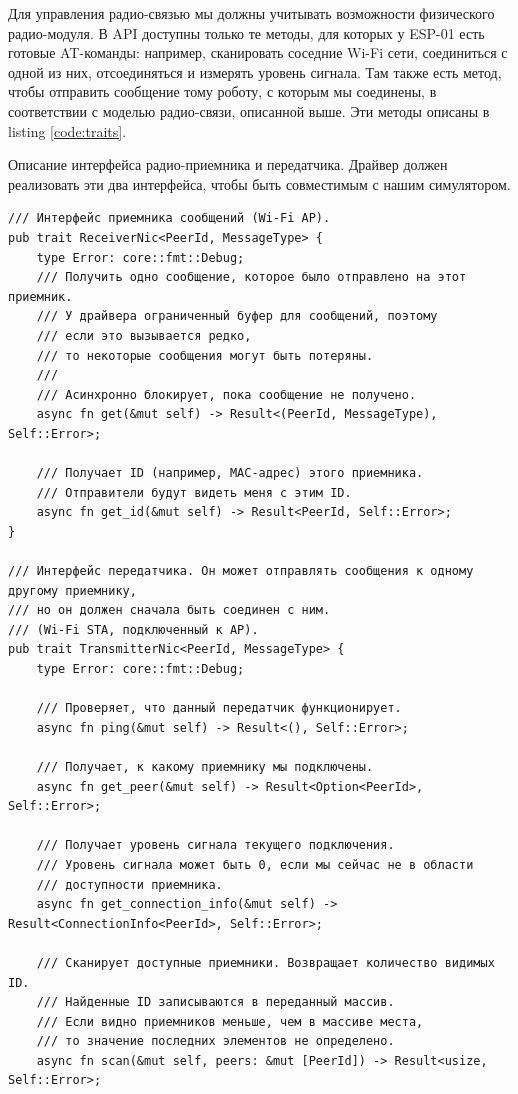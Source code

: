 \documentclass[%
]{report}
\begin{document}
Для управления радио-связью мы должны учитывать возможности физического радио-модуля.
В API доступны только те методы,
для которых у ESP-01 есть готовые AT-команды:
например, сканировать соседние Wi-Fi сети,
соединиться с одной из них,
отсоединяться
и измерять уровень сигнала.
Там также есть метод, чтобы отправить сообщение тому роботу,
с которым мы соединены,
в соответствии с моделью радио-связи, описанной выше.
Эти методы описаны в listing \ref{code:traits}.

\begin{listing}[h]
\caption{Описание интерфейса радио-приемника и передатчика.
Драйвер должен реализовать эти два интерфейса,
чтобы быть совместимым с нашим симулятором.}
\label{code:traits}
\begin{verbatim}
/// Интерфейс приемника сообщений (Wi-Fi AP).
pub trait ReceiverNic<PeerId, MessageType> {
    type Error: core::fmt::Debug;
    /// Получить одно сообщение, которое было отправлено на этот приемник.
    /// У драйвера ограниченный буфер для сообщений, поэтому
    /// если это вызывается редко,
    /// то некоторые сообщения могут быть потеряны.
    ///
    /// Асинхронно блокирует, пока сообщение не получено.
    async fn get(&mut self) -> Result<(PeerId, MessageType), Self::Error>;

    /// Получает ID (например, MAC-адрес) этого приемника.
    /// Отправители будут видеть меня с этим ID.
    async fn get_id(&mut self) -> Result<PeerId, Self::Error>;
}

/// Интерфейс передатчика. Он может отправлять сообщения к одному другому приемнику,
/// но он должен сначала быть соединен с ним.
/// (Wi-Fi STA, подключенный к AP).
pub trait TransmitterNic<PeerId, MessageType> {
    type Error: core::fmt::Debug;

    /// Проверяет, что данный передатчик функционирует.
    async fn ping(&mut self) -> Result<(), Self::Error>;

    /// Получает, к какому приемнику мы подключены.
    async fn get_peer(&mut self) -> Result<Option<PeerId>, Self::Error>;

    /// Получает уровень сигнала текущего подключения.
    /// Уровень сигнала может быть 0, если мы сейчас не в области
    /// доступности приемника.
    async fn get_connection_info(&mut self) -> Result<ConnectionInfo<PeerId>, Self::Error>;

    /// Сканирует доступные приемники. Возвращает количество видимых ID.
    /// Найденные ID записываются в переданный массив.
    /// Если видно приемников меньше, чем в массиве места,
    /// то значение последних элементов не определено.
    async fn scan(&mut self, peers: &mut [PeerId]) -> Result<usize, Self::Error>;


\end{verbatim}
\end{listing}
\end{document}
